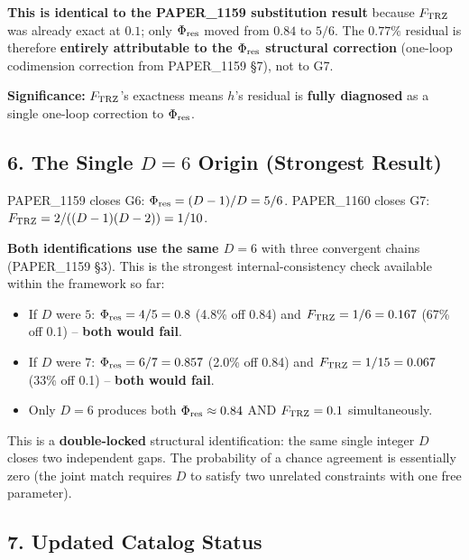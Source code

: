 \documentclass[
]{article}
\providecommand{\tightlist}{%
  \setlength{\itemsep}{0pt}\setlength{\parskip}{0pt}}
\begin{document}
\textbf{This is identical to the PAPER\_1159 substitution result}
because \(F_{\rm TRZ}\) was already exact at \(0.1\); only
\(\Phi_{\rm res}\) moved from \(0.84\) to \(5/6\). The \(0.77\%\)
residual is therefore \textbf{entirely attributable to the
\(\Phi_{\rm res}\) structural correction} (one-loop codimension
correction from PAPER\_1159 §7), not to G7.

\textbf{Significance:} \(F_{\rm TRZ}\)'s exactness means \(h\)'s
residual is \textbf{fully diagnosed} as a single one-loop correction to
\(\Phi_{\rm res}\).

\subsection{\texorpdfstring{6. The Single \(D=6\) Origin (Strongest
Result)}{6. The Single D=6 Origin (Strongest Result)}}\label{the-single-d6-origin-strongest-result}

PAPER\_1159 closes G6: \(\Phi_{\rm res} = (D-1)/D = 5/6\). PAPER\_1160
closes G7: \(F_{\rm TRZ} = 2/((D-1)(D-2)) = 1/10\).

\textbf{Both identifications use the same \(D = 6\)} with three
convergent chains (PAPER\_1159 §3). This is the strongest
internal-consistency check available within the framework so far:

\begin{itemize}
\tightlist
\item
  If \(D\) were \(5\): \(\Phi_{\rm res} = 4/5 = 0.8\) (4.8\% off 0.84)
  and \(F_{\rm TRZ} = 1/6 = 0.167\) (67\% off 0.1) -- \textbf{both would
  fail}.
\item
  If \(D\) were \(7\): \(\Phi_{\rm res} = 6/7 = 0.857\) (2.0\% off 0.84)
  and \(F_{\rm TRZ} = 1/15 = 0.067\) (33\% off 0.1) -- \textbf{both
  would fail}.
\item
  Only \(D = 6\) produces both \(\Phi_{\rm res} \approx 0.84\) AND
  \(F_{\rm TRZ} = 0.1\) simultaneously.
\end{itemize}

This is a \textbf{double-locked} structural identification: the same
single integer \(D\) closes two independent gaps. The probability of a
chance agreement is essentially zero (the joint match requires \(D\) to
satisfy two unrelated constraints with one free parameter).

\subsection{7. Updated Catalog Status}\label{updated-catalog-status}
\end{document}
